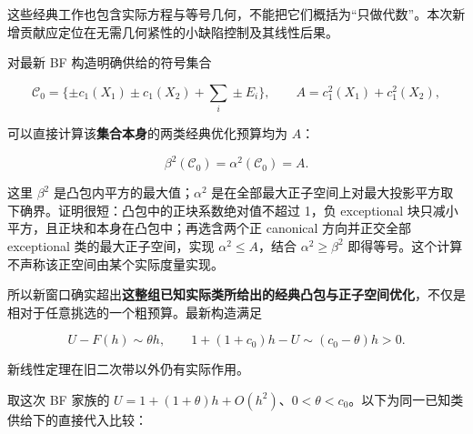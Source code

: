 \documentclass[
  10pt,
]{article}
\begin{document}
这些经典工作也包含实际方程与等号几何，不能把它们概括为``只做代数''。本次新增贡献应定位在无需几何紧性的小缺陷控制及其线性后果。

对最新 BF 构造明确供给的符号集合

\[
\mathcal C_0=
\{\pm c_1(X_1)\pm c_1(X_2)+\textstyle\sum_i\pm E_i\},
\qquad A=c_1^2(X_1)+c_1^2(X_2),
\]

可以直接计算该\textbf{集合本身}的两类经典优化预算均为 \(A\)：

\[
\beta^2(\mathcal C_0)=\alpha^2(\mathcal C_0)=A.
\]

这里 \(\beta^2\) 是凸包内平方的最大值；\(\alpha^2\)
是在全部最大正子空间上对最大投影平方取下确界。证明很短：凸包中的正块系数绝对值不超过
1，负 exceptional 块只减小平方，且正块和本身在凸包中；再选含两个正
canonical 方向并正交全部 exceptional 类的最大正子空间，实现
\(\alpha^2\le A\)，结合 \(\alpha^2\ge\beta^2\)
即得等号。这个计算不声称该正空间由某个实际度量实现。

所以新窗口确实超出\textbf{这整组已知实际类所给出的经典凸包与正子空间优化}，不仅是相对于任意挑选的一个粗预算。最新构造满足

\[
U-F(h)\sim\theta h,\qquad
1+(1+c_0)h-U\sim(c_0-\theta)h>0.
\]

新线性定理在旧二次带以外仍有实际作用。

取这次 BF 家族的
\(U=1+(1+\theta)h+O(h^2)\)、\(0<\theta<c_0\)。以下为同一已知类供给下的直接代入比较：
\end{document}
